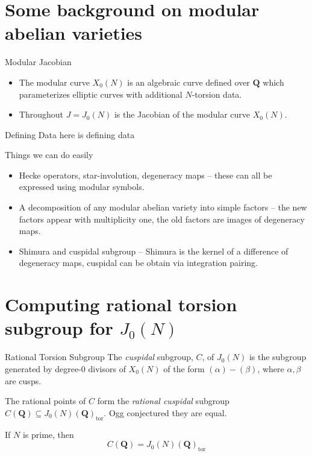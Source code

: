 \documentclass{beamer}
\newcommand{\QQ}{\mathbf{Q}}
\newcommand{\tor}{\mathrm{tor}}
\begin{document}
\section{Some background on modular abelian varieties}

\begin{frame}{Modular Jacobian}
    \begin{itemize}
        \item
            The modular curve $X_0(N)$ is an algebraic curve defined over $\QQ$
            which parameterizes elliptic curves with additional $N$-torsion
            data.
        \item 
            Throughout $J=J_0(N)$ is the Jacobian of the modular curve
            $X_0(N)$.
    \end{itemize} 
\end{frame}

\begin{frame}{Defining Data}
    here is defining data
\end{frame}

\begin{frame}{Things we can do easily}
    \begin{itemize}
        \item
            Hecke operators, star-involution, degeneracy maps -- these can all
            be expressed using modular symbols.
        \item
            A decomposition of any modular abelian variety into simple factors
            -- the new factors appear with multiplicity one, the old factors
            are images of degeneracy maps.
        \item 
            Shimura and cuspidal subgroup -- Shimura is the kernel of a
            difference of degeneracy maps, cuspidal can be obtain via
            integration pairing.
    \end{itemize}
\end{frame}

\section{Computing rational torsion subgroup for $J_0(N)$}

\begin{frame}{Rational Torsion Subgroup}
    The \emph{cuspidal} subgroup, $C$, of $J_0(N)$ is the subgroup generated by
    degree-0 divisors of $X_0(N)$ of the form $(\alpha)-(\beta)$, where
    $\alpha,\beta$ are cusps.

    The rational points of $C$ form the \emph{rational cuspidal} subgroup
    $C(\QQ)\subseteq J_0(N)(\QQ)_\tor$. Ogg conjectured they are equal.

    \begin{theorem}[Mazur '77]
        If $N$ is prime, then
        \[
            C(\QQ)=J_0(N)(\QQ)_\tor
        \]
    \end{theorem}
\end{frame}
\end{document}
